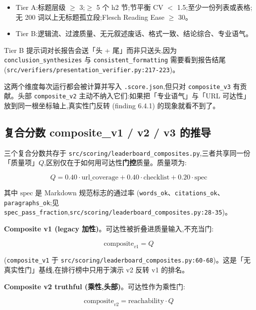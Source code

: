 \documentclass[UTF8,a4paper,12pt,oneside]{ctexart}
\begin{document}
\begin{itemize}[leftmargin=2em]
\item Tier A:标题层级 \(\geq\) 3;\(\geq\) 5 个 h2 节;节平衡 CV \(<\) 1.5;至少一份列表或表格;无 200 词以上无标题孤立段;Flesch Reading Ease \(\geq\) 30。
\item Tier B:逻辑流、过渡质量、无元叙述废话、格式一致、结论综合、专业语气。
\end{itemize}

Tier B 提示词对长报告会送「头 + 尾」而非只送头,因为 \texttt{conclusion\_synthesizes} 与 \texttt{consistent\_formatting} 需要看到报告结尾 (\texttt{src/verifiers/presentation\_verifier.py:217-223})。

这两个维度每次运行都会被计算并写入 \texttt{.score.json},但只对 \texttt{composite\_v3} 有贡献。头部 \texttt{composite\_v2} 主动不纳入它们:如果把「专业语气」与「URL 可达性」放到同一根坐标轴上,真实性门反转 (finding 6.4.1) 的现象就看不到了。

\subsection{复合分数 composite\_v1 / v2 / v3 的推导}

三个复合分数共存于 \texttt{src/scoring/leaderboard\_composites.py},三者共享同一份「质量项」\(Q\),区别仅在于如何用可达性\textbf{门控}质量。质量项为:

\begin{equation}
Q = 0.40 \cdot \text{url\_coverage} + 0.40 \cdot \text{checklist} + 0.20 \cdot \text{spec}
\end{equation}

其中 \(\text{spec}\) 是 Markdown 规范标志的通过率 (\texttt{words\_ok}、\texttt{citations\_ok}、\texttt{paragraphs\_ok};见 \texttt{spec\_pass\_fraction},\texttt{src/scoring/leaderboard\_composites.py:28-35})。

\textbf{Composite v1 (legacy 加性)}。可达性被折叠进质量输入,不充当门:

\begin{equation}
\text{composite}_{v1} = Q
\end{equation}

(\texttt{composite\_v1} 于 \texttt{src/scoring/leaderboard\_composites.py:60-68})。这是「无真实性门」基线,在排行榜中只用于演示 v2 反转 v1 的排名。

\textbf{Composite v2 truthful (乘性,头部)}。可达性作为乘性门:

\begin{equation}
\text{composite}_{v2} = \text{reachability} \cdot Q
\label{eq:v2}
\end{equation}
\end{document}
